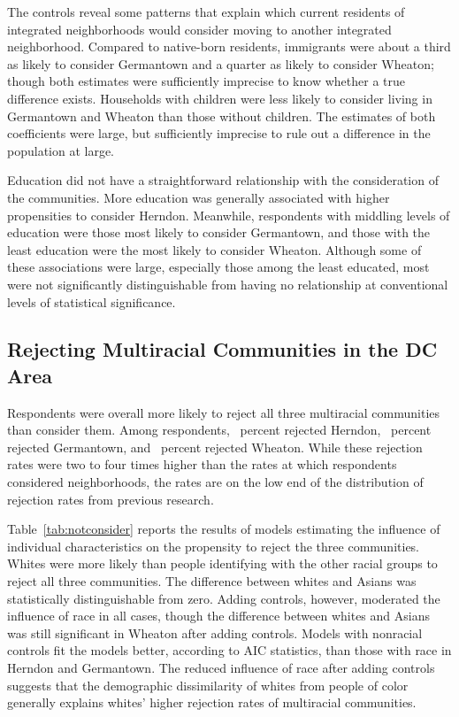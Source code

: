 \documentclass{baderart}
\begin{document}
The controls reveal some patterns that explain which current residents of integrated neighborhoods would consider moving to another integrated neighborhood. Compared to native-born residents, immigrants were about a third as likely to consider Germantown and a quarter as likely to consider Wheaton; though both estimates were sufficiently imprecise to know whether a true difference exists. Households with children were less likely to consider living in Germantown and Wheaton than those without children. The estimates of both coefficients were large, but sufficiently imprecise to rule out a difference in the population at large. 

Education did not have a straightforward relationship with the consideration of the communities. More education was generally associated with higher propensities to consider Herndon. Meanwhile, respondents with middling levels of education were those most likely to consider Germantown, and those with the least education were the most likely to consider Wheaton. Although some of these associations were large, especially those among the least educated, most were not significantly distinguishable from having no relationship at conventional levels of statistical significance. 

\subsection{Rejecting Multiracial Communities in the DC Area}\label{ssec:reject}

Respondents were overall more likely to reject all three multiracial communities than consider them. Among respondents, \ncherndon~percent rejected Herndon, \ncgermantown~percent rejected Germantown, and \ncwheaton~percent rejected Wheaton. While these rejection rates were two to four times higher than the rates at which respondents considered neighborhoods, the rates are on the low end of the distribution of rejection rates from previous research. 

Table~\ref{tab:notconsider} reports the results of models estimating the influence of individual characteristics on the propensity to reject the three communities. Whites were more likely than people identifying with the other racial groups to reject all three communities. The difference between whites and Asians was statistically distinguishable from zero. Adding controls, however, moderated the influence of race in all cases, though the difference between whites and Asians was still significant in Wheaton after adding controls. Models with nonracial controls fit the models better, according to AIC statistics, than those with race in Herndon and Germantown. The reduced influence of race after adding controls suggests that the demographic dissimilarity of whites from people of color generally explains whites' higher rejection rates of multiracial communities. 
\end{document}
